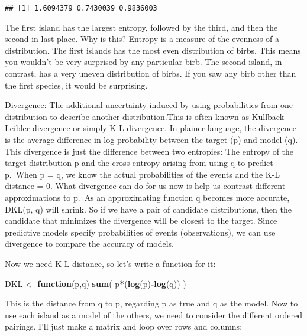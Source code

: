 \documentclass[
]{article}
\newenvironment{Shaded}{\begin{snugshade}}{\end{snugshade}}
\newcommand{\ControlFlowTok}[1]{\textcolor[rgb]{0.13,0.29,0.53}{\textbf{#1}}}
\newcommand{\KeywordTok}[1]{\textcolor[rgb]{0.13,0.29,0.53}{\textbf{#1}}}
\newcommand{\NormalTok}[1]{#1}
\newcommand{\OperatorTok}[1]{\textcolor[rgb]{0.81,0.36,0.00}{\textbf{#1}}}
\newcommand{\StringTok}[1]{\textcolor[rgb]{0.31,0.60,0.02}{#1}}
\begin{document}
\begin{verbatim}
## [1] 1.6094379 0.7430039 0.9836003
\end{verbatim}

The first island has the largest entropy, followed by the third, and
then the second in last place. Why is this? Entropy is a measure of the
evenness of a distribution. The first islands has the most even
distribution of birbs. This means you wouldn't be very surprised by any
particular birb. The second island, in contrast, has a very uneven
distribution of birbs. If you saw any birb other than the first species,
it would be surprising.

Divergence: The additional uncertainty induced by using probabilities
from one distribution to describe another distribution.This is often
known as Kullback-Leibler divergence or simply K-L divergence. In
plainer language, the divergence is the average difference in log
probability between the target (p) and model (q). This divergence is
just the difference between two entropies: The entropy of the target
distribution p and the cross entropy arising from using q to predict
p.~When p = q, we know the actual probabilities of the events and the
K-L distance = 0. What divergence can do for us now is help us contrast
different approximations to p.~As an approximating function q becomes
more accurate, DKL(p, q) will shrink. So if we have a pair of candidate
distributions, then the candidate that minimizes the divergence will be
closest to the target. Since predictive models specify probabilities of
events (observations), we can use divergence to compare the accuracy of
models.

Now we need K-L distance, so let's write a function for it:

\begin{Shaded}
\begin{Highlighting}[]
\NormalTok{DKL <-}\StringTok{ }\ControlFlowTok{function}\NormalTok{(p,q) }\KeywordTok{sum}\NormalTok{( p}\OperatorTok{*}\NormalTok{(}\KeywordTok{log}\NormalTok{(p)}\OperatorTok{-}\KeywordTok{log}\NormalTok{(q)) )}
\end{Highlighting}
\end{Shaded}

This is the distance from q to p, regarding p as true and q as the
model. Now to use each island as a model of the others, we need to
consider the different ordered pairings. I'll just make a matrix and
loop over rows and columns:
\end{document}
